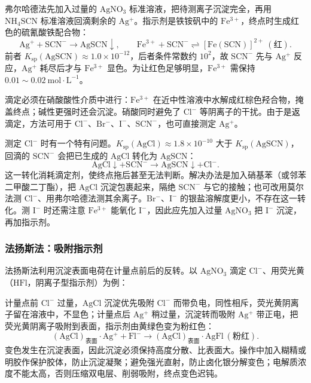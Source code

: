 \documentclass[UTF8]{ctexbook}
\begin{document}
弗尔哈德法先加入过量的 $\mathrm{AgNO_3}$ 标准溶液，把待测离子沉淀完全，再用 $\mathrm{NH_4SCN}$ 标准溶液回滴剩余的 $\mathrm{Ag^+}$。指示剂是铁铵矾中的 $\mathrm{Fe^{3+}}$，终点时生成红色的硫氰酸铁配合物：
\[
\mathrm{Ag^+}+\mathrm{SCN^-}\longrightarrow\mathrm{AgSCN}\downarrow,
\qquad
\mathrm{Fe^{3+}}+\mathrm{SCN^-}\rightleftharpoons[\mathrm{Fe(SCN)}]^{2+}\ (\text{红}).
\]
前者 $K_{\mathrm{sp}}(\mathrm{AgSCN})\approx1.0\times10^{-12}$，后者条件常数约 $10^2$，故 $\mathrm{SCN^-}$ 先与 $\mathrm{Ag^+}$ 反应，$\mathrm{Ag^+}$ 耗尽后才与 $\mathrm{Fe^{3+}}$ 显色。为让红色足够明显，$\mathrm{Fe^{3+}}$ 需保持 $0.01\sim0.02\ \mathrm{mol\cdot L^{-1}}$。

滴定必须在硝酸酸性介质中进行：$\mathrm{Fe^{3+}}$ 在近中性溶液中水解成红棕色羟合物，掩盖终点；碱性更强时还会沉淀。硝酸同时避免了 $\mathrm{Cl^-}$ 等阴离子的干扰。由于是返滴定，方法可用于 $\mathrm{Cl^-}$、$\mathrm{Br^-}$、$\mathrm{I^-}$、$\mathrm{SCN^-}$，也可直接测定 $\mathrm{Ag^+}$。

测定 $\mathrm{Cl^-}$ 时有一个特有问题。$K_{\mathrm{sp}}(\mathrm{AgCl})\approx1.8\times10^{-10}$ 大于 $K_{\mathrm{sp}}(\mathrm{AgSCN})$，回滴的 $\mathrm{SCN^-}$ 会把已生成的 $\mathrm{AgCl}$ 转化为 $\mathrm{AgSCN}$：
\[
\mathrm{AgCl}\downarrow+\mathrm{SCN^-}\longrightarrow\mathrm{AgSCN}\downarrow+\mathrm{Cl^-}.
\]
这一转化消耗滴定剂，使终点拖后甚至无法判断。解决办法是加入硝基苯（或邻苯二甲酸二丁酯），把 $\mathrm{AgCl}$ 沉淀包裹起来，隔绝 $\mathrm{SCN^-}$ 与它的接触；也可改用莫尔法测 $\mathrm{Cl^-}$、用弗尔哈德法测其余离子。$\mathrm{Br^-}$、$\mathrm{I^-}$ 的银盐溶解度更小，不存在这一转化。测 $\mathrm{I^-}$ 时还需注意 $\mathrm{Fe^{3+}}$ 能氧化 $\mathrm{I^-}$，因此应先加入过量 $\mathrm{AgNO_3}$ 把 $\mathrm{I^-}$ 沉淀，再加指示剂。

\subsubsection{法扬斯法：吸附指示剂}

法扬斯法利用沉淀表面电荷在计量点前后的反转。以 $\mathrm{AgNO_3}$ 滴定 $\mathrm{Cl^-}$、用荧光黄（$\mathrm{HFl}$，阴离子型指示剂）为例：

计量点前 $\mathrm{Cl^-}$ 过量，$\mathrm{AgCl}$ 沉淀优先吸附 $\mathrm{Cl^-}$ 而带负电，同性相斥，荧光黄阴离子留在溶液中，不显色；计量点后 $\mathrm{Ag^+}$ 稍过量，沉淀转而吸附 $\mathrm{Ag^+}$ 带正电，把荧光黄阴离子吸附到表面，指示剂由黄绿色变为粉红色：
\[
(\mathrm{AgCl})_{\text{表面}}\cdot\mathrm{Ag^+}+\mathrm{Fl^-}\longrightarrow(\mathrm{AgCl})_{\text{表面}}\cdot\mathrm{AgFl}\ (\text{粉红}).
\]
变色发生在沉淀表面，因此沉淀必须保持高度分散、比表面大。操作中加入糊精或明胶作保护胶体，防止沉淀凝聚；避免强光直射，防止卤化银分解变色；电解质浓度不能太高，否则压缩双电层、削弱吸附，终点变色迟钝。
\end{document}
